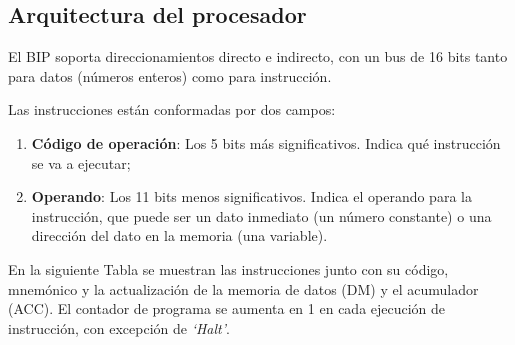 \documentclass[12pt,a4paper]{article}
\begin{document}
\subsection{Arquitectura del procesador}
\label{subs:arqui}

El BIP soporta direccionamientos directo e indirecto, con un bus de 16 bits tanto para datos (números enteros) como para instrucción.

Las instrucciones están conformadas por dos campos:

\begin{enumerate}
\item \textbf{Código de operación}: Los 5 bits más significativos. Indica qué instrucción se va a ejecutar;
\item \textbf{Operando}: Los 11 bits menos significativos. Indica el operando para la instrucción, que puede ser un dato inmediato (un número constante) o una dirección del dato en la memoria (una variable).
\end{enumerate}

En la siguiente Tabla se muestran las instrucciones junto con su código, mnemónico y la actualización de la memoria de datos (DM) y el acumulador (ACC). 
El contador de programa se aumenta en 1 en cada ejecución de instrucción, con excepción de \emph{`Halt'}.
\end{document}
